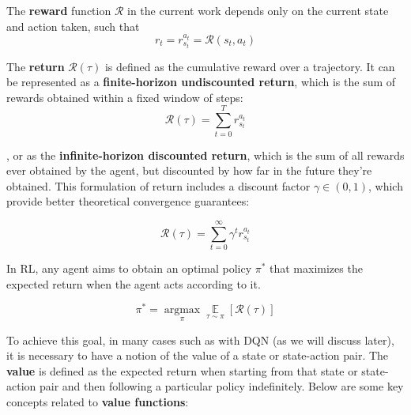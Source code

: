 The \textbf{reward} function $\mathcal{R}$ in the current work depends only on the current state and action taken, such that
$$r_t = r^{a_t}_{s_t} = \mathcal{R}(s_t,a_t)$$

The \textbf{return} $\mathcal{R}(\tau)$ is defined as the cumulative reward over a trajectory. It can be represented as a \textbf{finite-horizon undiscounted return}, which is the sum of rewards obtained within a fixed window of steps:
$$\mathcal{R}(\tau) = \sum_{t=0}^T r^{a_t}_{s_t}$$

, or as the \textbf{infinite-horizon discounted return}, which is the sum of all rewards ever obtained by the agent, but discounted by how far in the future they’re obtained. This formulation of return includes a discount factor $\gamma \in (0,1)$, which provide better theoretical convergence guarantees:

$$\mathcal{R}(\tau) = \sum_{t=0}^\infty \gamma^t r^{a_t}_{s_t}$$

In RL, any agent aims to obtain an optimal policy $\pi^\ast$ that maximizes the expected return when the agent acts according to it.

\begin{equation}
    \pi^\ast = \operatorname*{arg max}_\pi \mathop{\mathbb{E}}\limits_{\tau \sim \pi}\left[\mathcal{R}(\tau) \right]
\label{eq:rl_objective}
\end{equation}

To achieve this goal, in many cases such as with DQN (as we will discuss later), it is necessary to have a notion of the value of a state or state-action pair. The \textbf{value} is defined as the expected return when starting from that state or state-action pair and then following a particular policy indefinitely. Below are some key concepts related to \textbf{value functions}:

